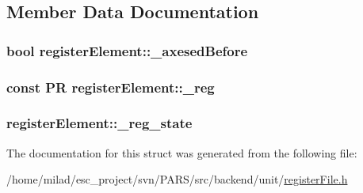 \subsection{Member Data Documentation}
\hypertarget{structregisterElement_a62ca0df1f9f090ad0077ecd55d736009}{
\subsubsection[{\_\-axesedBefore}]{\setlength{\rightskip}{0pt plus 5cm}bool {\bf registerElement::\_\-axesedBefore}}}
\label{structregisterElement_a62ca0df1f9f090ad0077ecd55d736009}
\hypertarget{structregisterElement_a4693e64de38fe55ae199c92f246ac518}{
\subsubsection[{\_\-reg}]{\setlength{\rightskip}{0pt plus 5cm}const {\bf PR} {\bf registerElement::\_\-reg}}}
\label{structregisterElement_a4693e64de38fe55ae199c92f246ac518}
\hypertarget{structregisterElement_ac9fe8172b609245e132ba12a0ea815ba}{
\subsubsection[{\_\-reg\_\-state}]{ {\bf registerElement::\_\-reg\_\-state}}}
\label{structregisterElement_ac9fe8172b609245e132ba12a0ea815ba}


The documentation for this struct was generated from the following file:\begin{DoxyCompactItemize}
\item 
/home/milad/esc\_\-project/svn/PARS/src/backend/unit/\hyperlink{registerFile_8h}{registerFile.h}\end{DoxyCompactItemize}
